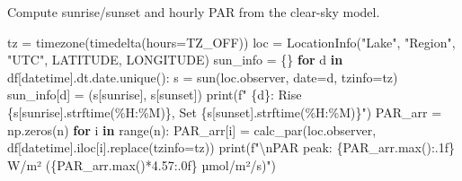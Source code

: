 \documentclass[
  letterpaper,
  DIV=11,
  numbers=noendperiod]{scrartcl}
\newenvironment{Shaded}{\begin{snugshade}}{\end{snugshade}}
\newcommand{\BuiltInTok}[1]{\textcolor[rgb]{0.00,0.23,0.31}{#1}}
\newcommand{\CharTok}[1]{\textcolor[rgb]{0.13,0.47,0.30}{#1}}
\newcommand{\ControlFlowTok}[1]{\textcolor[rgb]{0.00,0.23,0.31}{\textbf{#1}}}
\newcommand{\FloatTok}[1]{\textcolor[rgb]{0.68,0.00,0.00}{#1}}
\newcommand{\KeywordTok}[1]{\textcolor[rgb]{0.00,0.23,0.31}{\textbf{#1}}}
\newcommand{\NormalTok}[1]{\textcolor[rgb]{0.00,0.23,0.31}{#1}}
\newcommand{\OperatorTok}[1]{\textcolor[rgb]{0.37,0.37,0.37}{#1}}
\newcommand{\SpecialCharTok}[1]{\textcolor[rgb]{0.37,0.37,0.37}{#1}}
\newcommand{\SpecialStringTok}[1]{\textcolor[rgb]{0.13,0.47,0.30}{#1}}
\newcommand{\StringTok}[1]{\textcolor[rgb]{0.13,0.47,0.30}{#1}}
\begin{document}
Compute sunrise/sunset and hourly PAR from the clear-sky model.

\begin{Shaded}
\begin{Highlighting}[]
\NormalTok{tz  }\OperatorTok{=}\NormalTok{ timezone(timedelta(hours}\OperatorTok{=}\NormalTok{TZ\_OFF))}
\NormalTok{loc }\OperatorTok{=}\NormalTok{ LocationInfo(}\StringTok{"Lake"}\NormalTok{, }\StringTok{"Region"}\NormalTok{, }\StringTok{"UTC"}\NormalTok{, LATITUDE, LONGITUDE)}
\NormalTok{sun\_info }\OperatorTok{=}\NormalTok{ \{\}}
\ControlFlowTok{for}\NormalTok{ d }\KeywordTok{in}\NormalTok{ df[}\StringTok{\textquotesingle{}datetime\textquotesingle{}}\NormalTok{].dt.date.unique():}
\NormalTok{    s }\OperatorTok{=}\NormalTok{ sun(loc.observer, date}\OperatorTok{=}\NormalTok{d, tzinfo}\OperatorTok{=}\NormalTok{tz)}
\NormalTok{    sun\_info[d] }\OperatorTok{=}\NormalTok{ (s[}\StringTok{\textquotesingle{}sunrise\textquotesingle{}}\NormalTok{], s[}\StringTok{\textquotesingle{}sunset\textquotesingle{}}\NormalTok{])}
    \BuiltInTok{print}\NormalTok{(}\SpecialStringTok{f"  }\SpecialCharTok{\{}\NormalTok{d}\SpecialCharTok{\}}\SpecialStringTok{: Rise }\SpecialCharTok{\{}\NormalTok{s[}\StringTok{\textquotesingle{}sunrise\textquotesingle{}}\NormalTok{]}\SpecialCharTok{.}\NormalTok{strftime(}\StringTok{\textquotesingle{}\%H:\%M\textquotesingle{}}\NormalTok{)}\SpecialCharTok{\}}\SpecialStringTok{, Set }\SpecialCharTok{\{}\NormalTok{s[}\StringTok{\textquotesingle{}sunset\textquotesingle{}}\NormalTok{]}\SpecialCharTok{.}\NormalTok{strftime(}\StringTok{\textquotesingle{}\%H:\%M\textquotesingle{}}\NormalTok{)}\SpecialCharTok{\}}\SpecialStringTok{"}\NormalTok{)}
\NormalTok{PAR\_arr }\OperatorTok{=}\NormalTok{ np.zeros(n)}
\ControlFlowTok{for}\NormalTok{ i }\KeywordTok{in} \BuiltInTok{range}\NormalTok{(n):}
\NormalTok{    PAR\_arr[i] }\OperatorTok{=}\NormalTok{ calc\_par(loc.observer, df[}\StringTok{\textquotesingle{}datetime\textquotesingle{}}\NormalTok{].iloc[i].replace(tzinfo}\OperatorTok{=}\NormalTok{tz))}
\BuiltInTok{print}\NormalTok{(}\SpecialStringTok{f"}\CharTok{\textbackslash{}n}\SpecialStringTok{PAR peak: }\SpecialCharTok{\{}\NormalTok{PAR\_arr}\SpecialCharTok{.}\BuiltInTok{max}\NormalTok{()}\SpecialCharTok{:.1f\}}\SpecialStringTok{ W/m² (}\SpecialCharTok{\{}\NormalTok{PAR\_arr}\SpecialCharTok{.}\BuiltInTok{max}\NormalTok{()}\OperatorTok{*}\FloatTok{4.57}\SpecialCharTok{:.0f\}}\SpecialStringTok{ µmol/m²/s)"}\NormalTok{)}
\end{Highlighting}
\end{Shaded}
\end{document}
